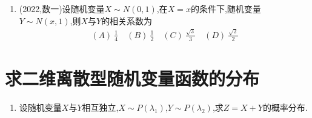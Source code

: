 \documentclass[12pt, a4paper, oneside, UTF8]{ctexbook}
\begin{document}
\begin{enumerate}[label=\arabic*.,start=3]
    \begin{solution}
    \newpage
    \end{solution}
    
    \item (2022,数一)设随机变量$X\sim N(0,1)$,在$X=x$的条件下,随机变量$Y\sim N(x,1)$,则$X$与$Y$的相关系数为
    \begin{align*}
        (A)\ \frac{1}{4} \quad (B)\ \frac{1}{2} \quad (C)\ \frac{\sqrt{3}}{3} \quad (D)\ \frac{\sqrt{2}}{2}
    \end{align*}
    
    \begin{solution}
    \newpage
    \end{solution}
\end{enumerate}

\section{求二维离散型随机变量函数的分布}

\begin{enumerate}[label=\arabic*.,start=8]
    \item 设随机变量$X$与$Y$相互独立,$X\sim P(\lambda_1)$,$Y\sim P(\lambda_2)$,求$Z=X+Y$的概率分布.
    
    \begin{solution}
    \newpage
    \end{solution}
\end{enumerate}
\end{document}
